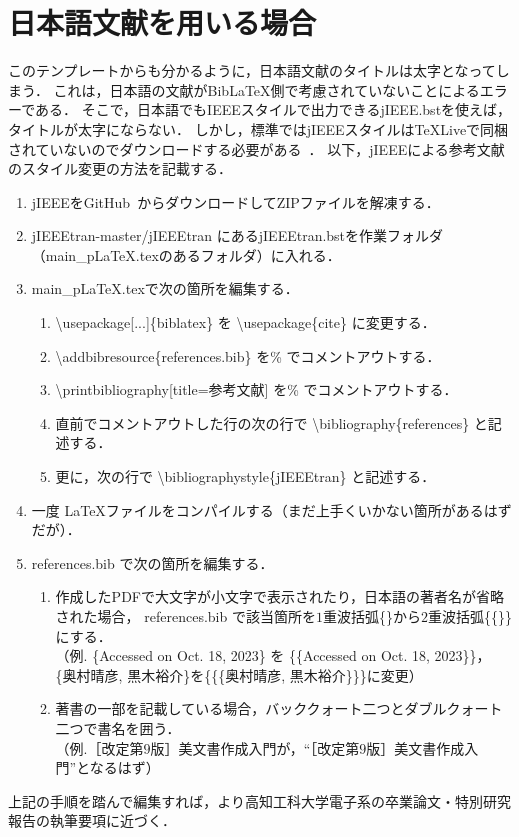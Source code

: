 \chapter{日本語文献を用いる場合}
このテンプレートからも分かるように，日本語文献のタイトルは太字となってしまう．
これは，日本語の文献がBib{\LaTeX}側で考慮されていないことによるエラーである．
そこで，日本語でもIEEEスタイルで出力できるjIEEE.bstを使えば，タイトルが太字にならない．
しかし，標準ではjIEEEスタイルは\TeX Liveで同梱されていないのでダウンロードする必要がある~\cite{jieeetran}．
以下，jIEEEによる参考文献のスタイル変更の方法を記載する．

\begin{enumerate}
    \item jIEEEをGitHub~\cite{jieeetran}からダウンロードしてZIPファイルを解凍する．
    \item jIEEEtran-master/jIEEEtran にあるjIEEEtran.bstを作業フォルダ（main\_pLaTeX.texのあるフォルダ）に入れる．
    \item main\_pLaTeX.texで次の箇所を編集する．
        \begin{enumerate}
            \item \textbackslash usepackage[...]\{biblatex\} を \textbackslash usepackage\{cite\} に変更する．
            \item \textbackslash addbibresource\{references.bib\} を\% でコメントアウトする．
            \item \textbackslash printbibliography[title={参考文献}] を\% でコメントアウトする．
            \item 直前でコメントアウトした行の次の行で \textbackslash bibliography\{references\} と記述する．
            \item 更に，次の行で \textbackslash bibliographystyle\{jIEEEtran\} と記述する．
        \end{enumerate}
    \item 一度 \LaTeX ファイルをコンパイルする（まだ上手くいかない箇所があるはずだが）．
    \item references.bib で次の箇所を編集する．
        \begin{enumerate}
            \item 作成したPDFで大文字が小文字で表示されたり，日本語の著者名が省略された場合，
                references.bib で該当箇所を$1$重波括弧\{\}から$2$重波括弧\{\{\}\}にする．\\
                （例. \{Accessed on Oct. 18, 2023\} を \{\{Accessed on Oct. 18, 2023\}\}，\\
                    \{奥村晴彦, 黒木裕介\}を\{\{\{奥村晴彦, 黒木裕介\}\}\}に変更）
            \item 著書の一部を記載している場合，バッククォート二つとダブルクォート二つで書名を囲う．\\
                （例.［改定第$9$版］\LaTeXe 美文書作成入門が，``［改定第$9$版］\LaTeXe 美文書作成入門''となるはず）
        \end{enumerate}
\end{enumerate}

上記の手順を踏んで編集すれば，より高知工科大学電子系の卒業論文・特別研究報告の執筆要項に近づく．